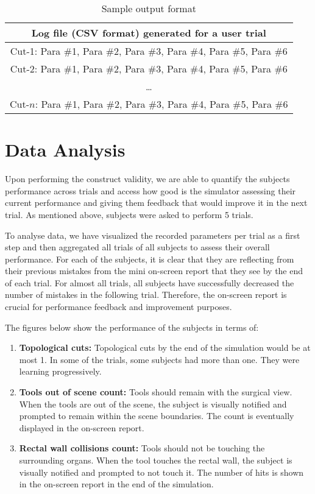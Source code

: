 \begin{table}
\small
\centering
\begin{tabular}{c}
 Log file (CSV format) generated for a user trial\\
 \toprule
 Cut-1: Para \#1, Para \#2, Para \#3, Para \#4, Para \#5, Para \#6 \\
 \midrule
 Cut-2: Para \#1, Para \#2, Para \#3, Para \#4, Para \#5, Para \#6\\
 \midrule
 \ldots\\
 \midrule
 Cut-$n$: Para \#1, Para \#2, Para \#3, Para \#4, Para \#5, Para \#6\\
 \bottomrule
\end{tabular}
\caption{Sample output format}
\label{tab:csv}
\end{table}

\section{Data Analysis}
Upon performing the construct validity, we are able to quantify the subjects performance across trials and access how good is the simulator assessing their current performance and giving them feedback that would improve it in the next trial. As mentioned above, subjects were asked to perform 5 trials.

To analyse data, we have visualized the recorded parameters per trial as a first step and then aggregated all trials of all subjects to assess their overall performance. For each of the subjects, it is clear that they are reflecting from their previous mistakes from the mini on-screen report that they see by the end of each trial. For almost all trials, all subjects have successfully decreased the number of mistakes in the following trial. Therefore, the on-screen report is crucial for performance feedback and improvement purposes.

The figures below show the performance of the subjects in terms of:
\begin{enumerate}
    \item \textbf{Topological cuts:} Topological cuts by the end of the simulation would be at most 1. In some of the trials, some subjects had more than one. They were learning progressively.
    \item \textbf{Tools out of scene count:} Tools should remain with the surgical view. When the tools are out of the scene, the subject is visually notified and prompted to remain within the scene boundaries. The count is eventually displayed in the on-screen report.
    \item \textbf{Rectal wall collisions count:} Tools should not be touching the surrounding organs. When the tool touches the rectal wall, the subject is visually notified and prompted to not touch it. The number of hits is shown in the on-screen report in the end of the simulation.
\end{enumerate}

